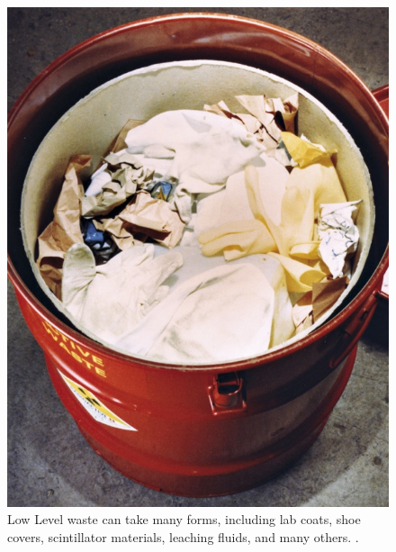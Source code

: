 \begin{figure}[htb!]
  \begin{center}
    \includegraphics[height=0.7\textheight]{./images/LLW_barrel.jpg}
  \end{center}
  \caption{Low Level waste can take many forms, including lab coats, shoe
    covers, scintillator materials, leaching fluids, and many others.
    \cite{noauthor_uk_2014}.}
  \label{fig:llw}
\end{figure}
